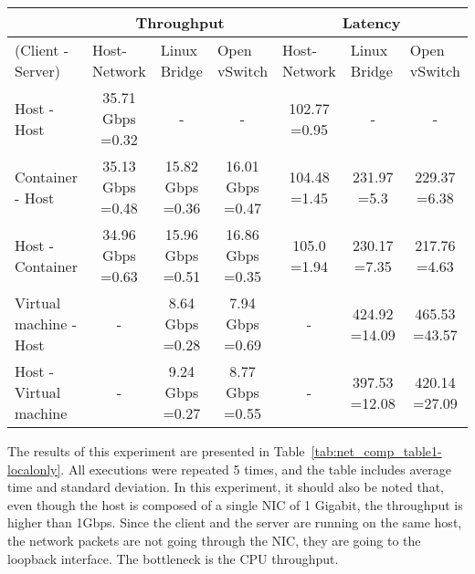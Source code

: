 \documentclass[conference]{IEEEtran}
\begin{document}
\begin{table*}[!t]
\renewcommand{\arraystretch}{1.3}
\centering
\caption{Network throughput and latency evaluation for different
    configurations of client/server under bare-metal, container
and virtual machine on a single host machine}
\begin{tabular}{|l|c|c|c||c|c|c|}
\hline
& \multicolumn{3}{c||}{Throughput} & \multicolumn{3}{c|}{Latency}                                                                \\
\hline
(Client - Server) & \multicolumn{1}{l|}{Host-Network} & \multicolumn{1}{l|}{Linux Bridge } & \multicolumn{1}{l||}{Open vSwitch} & \multicolumn{1}{l|}{Host-Network} & \multicolumn{1}{l|}{Linux Bridge } & \multicolumn{1}{l|}{Open vSwitch}  \\
\hline
\hline
Host - Host            & 35.71 Gbps =0.32 & -                        & -                        & 102.77 	=0.95 & -                               & -                               \\ \hline
Container - Host       & 35.13 Gbps =0.48 & 15.82 Gbps =0.36 & 16.01 Gbps =0.47 & 104.48 =1.45 & 231.97 =5.3   & 229.37	=6.38 \\ \hline
Host - Container       & 34.96 Gbps =0.63 & 15.96 Gbps =0.51 & 16.86 Gbps =0.35 & 105.0	=1.94  & 230.17 =7.35  & 217.76	=4.63 \\ \hline
Virtual machine - Host & - 						  & 8.64 Gbps =0.28  & 7.94 Gbps =0.69         & - 	                       & 424.92 =14.09 & 465.53 =43.57             \\ \hline
Host - Virtual machine & - 						  & 9.24 Gbps =0.27  & 8.77 Gbps =0.55         & - 	                       & 397.53 =12.08 & 420.14 =27.09            \\ \hline
\end{tabular}
\label{tab:net_comp_table1-localonly}
\end{table*}

The results of this experiment are presented in
Table~\ref{tab:net_comp_table1-localonly}. All executions were repeated
5 times, and the table includes average time and standard deviation. In this
experiment, it should also be noted that, even though the host is composed of a
single NIC of 1 Gigabit, the throughput is higher than 1Gbps. 
Since the client and the server are running on the same host, the 
network packets are not going through the NIC, they are going to 
the loopback interface. The bottleneck is the CPU throughput.
\end{document}
